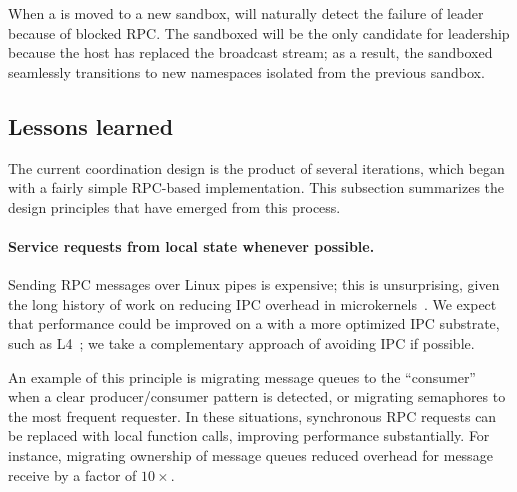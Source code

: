 When a \picoproc{} is moved to a new sandbox, \thelibos{} will naturally detect the failure of leader because of blocked RPC. %
The sandboxed \picoproc{} will be the only candidate for leadership because the host has replaced the broadcast stream;
as a result, the sandboxed \picoproc{} seamlessly transitions to new namespaces isolated from the previous sandbox.


\subsection{Lessons learned}
\label{sec:libos:namespaces:lessons}

The current coordination design is the product of several iterations, which began 
with a fairly simple RPC-based implementation. %
This subsection summarizes the design principles that have emerged from this process.

\paragraph{Service requests from local state whenever possible.}
Sending RPC messages over Linux pipes is expensive;
this is unsurprising, given the long history of 
work on reducing IPC overhead in microkernels~\cite{liedtke93sosp,chen93memory}.  
We expect that \graphene{} performance could be improved on a 
\microkernel{} with
a more optimized IPC substrate, such as L4~\cite{liedtke95sosp,klein09sel4,elphinstone13microkernels};
we take a complementary approach of avoiding IPC if possible.

An example of this principle is migrating message queues to the ``consumer'' when a 
clear producer/consumer pattern is detected, or migrating semaphores to the most frequent requester.
In these situations, synchronous RPC requests can be replaced with local function calls, improving
performance substantially.  For instance, migrating ownership of message queues 
reduced overhead for message receive by a factor of $10\times$.

